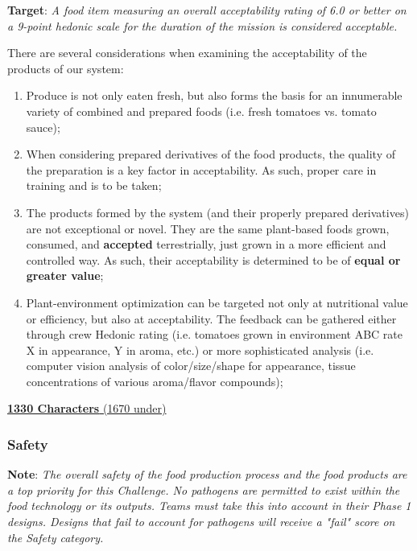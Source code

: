 \documentclass{report}
\begin{document}
\textbf{Target}: \textit{A food item measuring an overall acceptability rating of 6.0 or better on a 9-point hedonic scale for the duration of the mission is considered acceptable.}


There are several considerations when examining the acceptability of the products of our system:

\begin{enumerate}
    \item Produce is not only eaten fresh, but also forms the basis for an innumerable variety of combined and prepared foods (i.e. fresh tomatoes vs. tomato sauce);
    \item When considering prepared derivatives of the food products, the quality of the preparation is a key factor in acceptability. As such, proper care in training and is to be taken;
    \item The products formed by the system (and their properly prepared derivatives) are not exceptional or novel. They are the same plant-based foods grown, consumed, and \textbf{accepted} terrestrially, just grown in a more efficient and controlled way. As such, their acceptability is determined to be of \textbf{equal or greater value};
    \item Plant-environment optimization can be targeted not only at nutritional value or efficiency, but also at acceptability. The feedback can be gathered either through crew Hedonic rating (i.e. tomatoes grown in environment ABC rate X in appearance, Y in aroma, etc.) or more sophisticated analysis (i.e. computer vision analysis of color/size/shape for appearance, tissue concentrations of various aroma/flavor compounds); %
\end{enumerate}

\uline{\textbf{1330 Characters} (1670 under)}


\subsubsection{Safety}
\label{sec:safety}

\textbf{Note}: \textit{The overall safety of the food production process and the food products are a top priority for this Challenge. No pathogens are permitted to exist within the food technology or its outputs.  Teams must take this into account in their Phase 1 designs. Designs that fail to account for pathogens will receive a "fail" score on the Safety category.}
\end{document}
